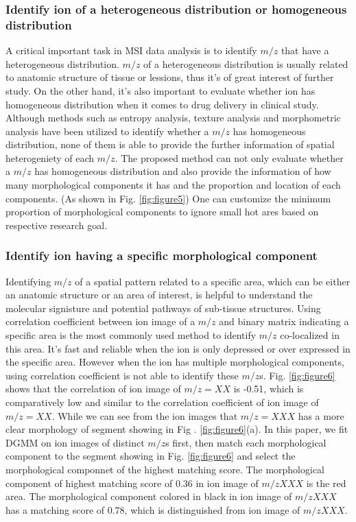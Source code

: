 \documentclass{bioinfo}
\begin{document}
\subsubsection{Identify ion of a heterogeneous distribution or homogeneous distribution}
A critical important task in MSI data analysis is to identify $m/z$ that have a heterogeneous distribution. $m/z$ of a heterogeneous distribution is usually related to anatomic structure of tissue or lessions, thus it's of great interest of further study. On the other hand, it's also important to evaluate whether ion has homogeneous distribution when it comes to drug delivery in clinical study. Although methods such as entropy analysis, texture analysis and morphometric analysis have been utilized to identify whether a $m/z$ has homogeneous distribution, none of them is able to provide the further information of spatial heterogeniety of each $m/z$. The proposed method can not only evaluate whether  a $m/z$ has homogeneous distribution and also provide the information of how many morphological components it has and the proportion and location of each components. (As shown in Fig. \ref{fig:figure5}) One can customize the minimum proportion of morphological components to ignore small hot ares based on respective research goal.



\subsubsection{Identify ion having a specific morphological component}
Identifying $m/z$ of a spatial pattern related to a specific area, which can be either an anatomic structure or an area of interest, is helpful to understand the molecular signisture and potential pathways of sub-tissue structures. Using correlation coefficient between ion image of a $m/z$ and binary matrix indicating a specific area is the most commonly used method to identify $m/z$ co-localized in this area. It's fast and reliable when the ion is only depressed or over expressed in the specific area. However when the ion has multiple morphological components, using correlation coefficient is not able to identify these $m/z$s. Fig. \ref{fig:figure6} shows that the correlation of ion image of $m/z=XX$ is -0.51, which is comparatively low and similar to the correlation coefficient of ion image of $m/z=XX$. While we can see from the ion images that $m/z=XXX$ has a more clear morphology of segment showing in Fig . \ref{fig:figure6}(a). In this paper, we fit DGMM on ion images of distinct $m/z$s first, then match each morphological component to the segment showing in Fig. \ref{fig:figure6} and select the morphological componnet of the highest matching score. The morphological component of highest matching score of 0.36 in ion image of $m/zXXX$ is the red area. The morphological component colored in black  in ion image of $m/zXXX$ has a matching score of 0.78, which is distinguished from ion image of $m/z XXX$.
\end{document}

